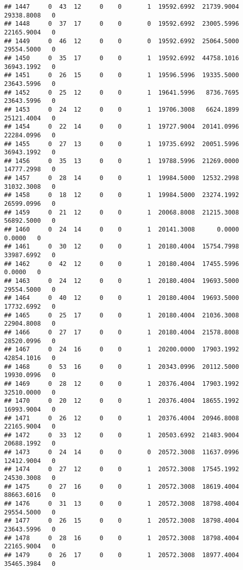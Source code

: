 \documentclass[
]{article}
\begin{document}
\begin{enumerate}
\begin{verbatim}
## 1447     0  43  12     0    0       1  19592.6992  21739.9004  29338.8008   0
## 1448     0  37  17     0    0       0  19592.6992  23005.5996  22165.9004   0
## 1449     0  46  12     0    0       0  19592.6992  25064.5000  29554.5000   0
## 1450     0  35  17     0    0       1  19592.6992  44758.1016  36943.1992   0
## 1451     0  26  15     0    0       1  19596.5996  19335.5000  23643.5996   0
## 1452     0  25  12     0    0       1  19641.5996   8736.7695  23643.5996   0
## 1453     0  24  12     0    0       1  19706.3008   6624.1899  25121.4004   0
## 1454     0  22  14     0    0       1  19727.9004  20141.0996  22284.0996   0
## 1455     0  27  13     0    0       1  19735.6992  20051.5996  36943.1992   0
## 1456     0  35  13     0    0       1  19788.5996  21269.0000  14777.2998   0
## 1457     0  28  14     0    0       1  19984.5000  12532.2998  31032.3008   0
## 1458     0  18  12     0    0       1  19984.5000  23274.1992  26599.0996   0
## 1459     0  21  12     0    0       1  20068.8008  21215.3008  56892.5000   0
## 1460     0  24  14     0    0       1  20141.3008      0.0000      0.0000   0
## 1461     0  30  12     0    0       1  20180.4004  15754.7998  33987.6992   0
## 1462     0  42  12     0    0       1  20180.4004  17455.5996      0.0000   0
## 1463     0  24  12     0    0       1  20180.4004  19693.5000  29554.5000   0
## 1464     0  40  12     0    0       1  20180.4004  19693.5000  17732.6992   0
## 1465     0  25  17     0    0       1  20180.4004  21036.3008  22904.8008   0
## 1466     0  27  17     0    0       1  20180.4004  21578.8008  28520.0996   0
## 1467     0  24  16     0    0       1  20200.0000  17903.1992  42854.1016   0
## 1468     0  53  16     0    0       1  20343.0996  20112.5000  19930.0996   0
## 1469     0  28  12     0    0       1  20376.4004  17903.1992  32510.0000   0
## 1470     0  20  12     0    0       1  20376.4004  18655.1992  16993.9004   0
## 1471     0  26  12     0    0       1  20376.4004  20946.8008  22165.9004   0
## 1472     0  33  12     0    0       1  20503.6992  21483.9004  20688.1992   0
## 1473     0  24  14     0    0       0  20572.3008  11637.0996  12412.9004   0
## 1474     0  27  12     0    0       1  20572.3008  17545.1992  24530.3008   0
## 1475     0  27  16     0    0       1  20572.3008  18619.4004  88663.6016   0
## 1476     0  31  13     0    0       1  20572.3008  18798.4004  29554.5000   0
## 1477     0  26  15     0    0       1  20572.3008  18798.4004  23643.5996   0
## 1478     0  28  16     0    0       1  20572.3008  18798.4004  22165.9004   0
## 1479     0  26  17     0    0       1  20572.3008  18977.4004  35465.3984   0

\end{verbatim}
\end{enumerate}
\end{document}
